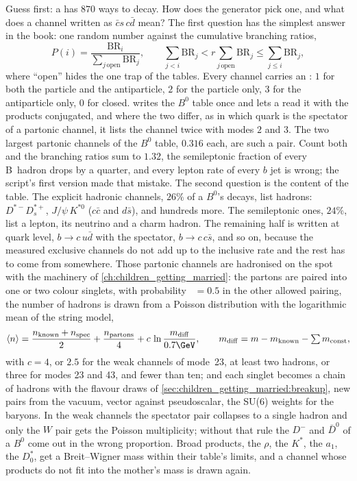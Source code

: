 Guess first: a \Bbar has $870$ ways to decay. How does the generator pick
one, and what does a channel written as $\bar c s\,c\bar d$ mean? The
first question has the simplest answer in the book: one random number
against the cumulative branching ratios,
\begin{equation}
  P(i)=\frac{\mathrm{BR}_i}{\sum_{j\,\mathrm{open}}\mathrm{BR}_j},\qquad
  \sum_{j<i}\mathrm{BR}_j<r\sum_{j\,\mathrm{open}}\mathrm{BR}_j\le\sum_{j\le i}\mathrm{BR}_j,
  \label{eq:children_producing_grandchildren:channel}
\end{equation}
where ``open'' hides the one trap of the tables. Every channel carries an
: $1$ for both the particle and the antiparticle, $2$ for the
particle only, $3$ for the antiparticle only, $0$ for closed. \PYTHIA
writes the $B^0$ table once and lets a \Bbar read it with the products
conjugated, and where the two differ, as in which quark is the spectator
of a partonic channel, it lists the channel twice with modes $2$ and $3$.
The two largest partonic channels of the $B^0$ table, $0.316$ each, are
such a pair. Count both and the branching ratios sum to $1.32$, the
semileptonic fraction of every B~hadron drops by a quarter, and every
lepton rate of every $b$ jet is wrong; the script's first version made
that mistake. The second question is the content of the table. The
explicit hadronic channels, $26\%$ of a $B^0$'s decays, list hadrons:
$D^{*-}D_s^{*+}$, $J/\psi\,K^{*0}$ ($c\bar c$ and $d\bar s$), and hundreds
more. The semileptonic ones, $24\%$, list a lepton, its neutrino and a
charm hadron. The remaining half is written at quark level, $b\to c\,u\bar d$
with the spectator, $b\to c\,c\bar s$, and so on, because the measured
exclusive channels do not add up to the inclusive rate and the rest has to
come from somewhere. Those partonic channels are hadronised on the spot
with the machinery of \cref{ch:children_getting_married}: the partons are
paired into one or two colour singlets, with probability
~$=0.5$ in the other allowed pairing, the number of
hadrons is drawn from a Poisson distribution with the logarithmic mean of
the string model,
\begin{equation}
  \langle n\rangle=\frac{n_{\mathrm{known}}+n_{\mathrm{spec}}}{2}+\frac{n_{\mathrm{partons}}}{4}
  +c\,\ln\frac{m_{\mathrm{diff}}}{0.7\GeV},\qquad
  m_{\mathrm{diff}}=m-m_{\mathrm{known}}-\textstyle\sum m_{\mathrm{const}},
  \label{eq:children_producing_grandchildren:poisson}
\end{equation}
with $c=4$, or $2.5$ for the weak channels of mode~23, at least two
hadrons, or three for modes 23 and 43, and fewer than ten; and each
singlet becomes a chain of hadrons with the flavour draws of
\cref{sec:children_getting_married:breakup}, new pairs from the vacuum,
vector against pseudoscalar, the SU(6) weights for the baryons. In the
weak channels the spectator pair collapses to a single hadron and only the
$W$ pair gets the Poisson multiplicity; without that rule the $D^-$ and
$\bar D^0$ of a $B^0$ come out in the wrong proportion. Broad products,
the $\rho$, the $K^*$, the $a_1$, the $D_0^*$, get a Breit--Wigner mass
within their table's limits, and a channel whose products do not fit into
the mother's mass is drawn again.

